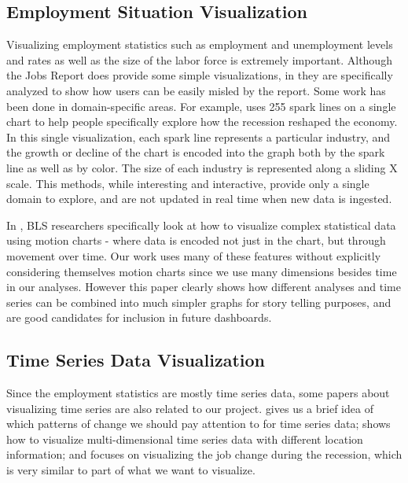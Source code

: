 \documentclass{sigchi}
\begin{document}
\subsection{Employment Situation Visualization}

Visualizing employment statistics such as employment and unemployment levels and rates as well as the size of the labor force is extremely important. Although the Jobs Report does provide some simple visualizations, in \cite{leonhardt_how_2014} they are specifically analyzed to show how users can be easily misled by the report. Some work has been done in domain-specific areas. For example, \cite{ashkenas_how_2014} uses 255 spark lines on a single chart to help people specifically explore how the recession reshaped the economy. In this single visualization, each spark line represents a particular industry, and the growth or decline of the chart is encoded into the graph both by the spark line as well as by color. The size of each industry is represented along a sliding X scale. This methods, while interesting and interactive, provide only a single domain to explore, and are not updated in real time when new data is ingested.

In \cite{battista_motion_2011}, BLS researchers specifically look at how to visualize complex statistical data using motion charts - where data is encoded not just in the chart, but through movement over time. Our work uses many of these features without explicitly considering themselves motion charts since we use many dimensions besides time in our analyses. However this paper clearly shows how different analyses and time series can be combined into much simpler graphs for story telling purposes, and are good candidates for inclusion in future dashboards.

\subsection{Time Series Data Visualization}

Since the employment statistics are mostly time series data, some papers \cite{few_visualizing_2007,peng_method_2008,ashkenas_how_2014} about visualizing time series are also related to our project. \cite{few_visualizing_2007}  gives us a brief idea of which patterns of change we should pay attention to for time series data; \cite{peng_method_2008} shows how to visualize multi-dimensional time series data with different location information; and \cite{ashkenas_how_2014} focuses on visualizing the job change during the recession, which is very similar to part of what we want to visualize.
\end{document}
